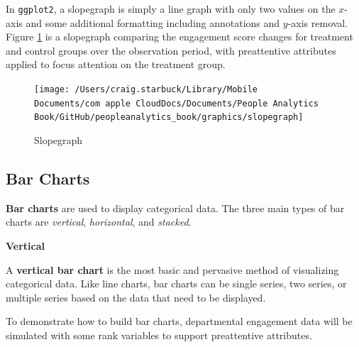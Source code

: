 \documentclass[
]{book}
\begin{document}
In \texttt{ggplot2}, a slopegraph is simply a line graph with only two values on the \(x\)-axis and some additional formatting including annotations and \(y\)-axis removal. Figure \ref{fig:slopegraph} is a slopegraph comparing the engagement score changes for treatment and control groups over the observation period, with preattentive attributes applied to focus attention on the treatment group.

\begin{figure}

{\centering \texttt{[image: /Users/craig.starbuck/Library/Mobile Documents/com~apple~CloudDocs/Documents/People Analytics Book/GitHub/peopleanalytics\_book/graphics/slopegraph]} 

}

\caption{Slopegraph}\label{fig:slopegraph}
\end{figure}

\hypertarget{bar-charts}{%
\subsection{Bar Charts}\label{bar-charts}}

\textbf{Bar charts} are used to display categorical data. The three main types of bar charts are \emph{vertical}, \emph{horizontal}, and \emph{stacked}.

\textbf{Vertical}

A \textbf{vertical bar chart} is the most basic and pervasive method of visualizing categorical data. Like line charts, bar charts can be single series, two series, or multiple series based on the data that need to be displayed.

To demonstrate how to build bar charts, departmental engagement data will be simulated with some rank variables to support preattentive attributes.
\end{document}
